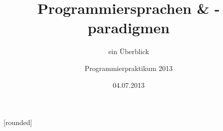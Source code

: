 \usepackage[ngerman]{babel}
\usepackage[utf8]{inputenc}
\usepackage{listings}

\usepackage{amsmath,amsfonts,amssymb}


\beamertemplatenavigationsymbolsempty

\title{Programmiersprachen \& -paradigmen}
\subtitle{ein Überblick}
\author[Sebastian Krings, Max Ahrend, Alexander Schneider]{Programmierpraktikum 2013}
\date{04.07.2013}

\subject{}
\keywords{}


[rounded]

\usepackage{color}

\usepackage{listings}


\newcommand{\console}[1]{\begin{center}\colorbox{black}{\parbox{0.8\textwidth}{\textcolor{white}{#1}}}\end{center}}

